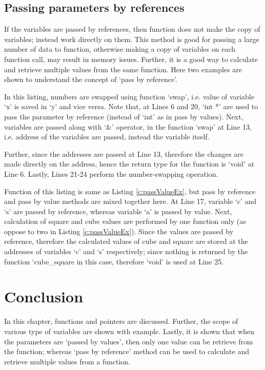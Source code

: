 \subsection{Passing parameters by references}
If the variables are passed by references, then function does not make the copy of variables; instead work directly on them. This method is good for passing a large number of data to function, otherwise making a copy of variables on each function call, may result in memory issues. Further, it is a good way to calculate and retrieve multiple values from the same function. Here two examples are shown to understand the concept of `pass by reference'. 

\begin{explanation}
	In this listing, numbers are swapped using function `swap', i.e. value of variable `x' is saved in `y' and vice versa. Note that, at Lines 6 and 20, `int *' are used to pass the parameter by reference (instead of `int' as in pass by values). Next, variables are passed along with `$\&$' operator, in the function `swap'  at Line 13, i.e. address of the variables are passed, instead the variable itself. 
	
	 Further, since the addresses are passed at Line 13, therefore  the changes are made directly on the address, hence the return type for the function is `void' at Line 6. Lastly, Lines 21-24 perform the number-swapping operation. 
\end{explanation}


\begin{explanation}
	Function of this listing is same as Listing \ref{c:passValueEx}, but pass by reference and pass by value methods are mixed together here. At Line 17, variable `c' and `s' are passed by reference, whereas variable `a' is passed by value. Next, calculation of square and cube values are performed by one function only (as oppose to two in Listing \ref{c:passValueEx}). Since the values are passed by reference, therefore the calculated values of cube and square are stored at the addresses of variables `c' and `s' respectively; since nothing is returned by the function `cube\_square in this case, therefore `void' is used at Line 25. 
\end{explanation}


\section{Conclusion}
In this chapter, functions and pointers are discussed. Further, the scope of various type of variables are shown with example. Lastly, it is shown that when the parameters are `passed by values', then only one value can be retrieve from the function; whereas `pass by reference' method can be used to calculate and retrieve multiple values from a function. 


